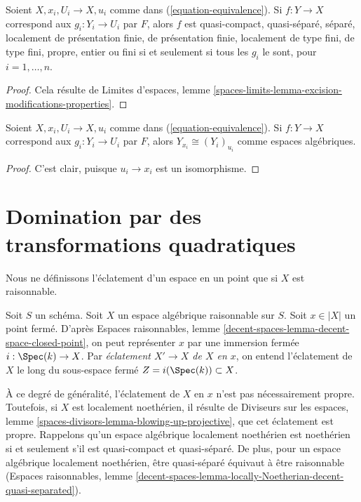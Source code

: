 \begin{lemma}
\label{lemma-equivalence-properties}
Soient $X, x_i, U_i \to X, u_i$ comme dans
(\ref{equation-equivalence}). Si $f : Y \to X$ correspond aux
$g_i : Y_i \to U_i$ par $F$, alors $f$ est quasi-compact, quasi-séparé,
séparé, localement de présentation finie, de présentation finie, localement
de type fini, de type fini, propre, entier ou fini si et seulement si tous les
$g_i$ le sont, pour $i = 1, \ldots, n$.
\end{lemma}

\begin{proof}
Cela résulte de Limites d'espaces, lemme
\ref{spaces-limits-lemma-excision-modifications-properties}.
\end{proof}

\begin{lemma}
\label{lemma-equivalence-fibre}
Soient $X, x_i, U_i \to X, u_i$ comme dans
(\ref{equation-equivalence}). Si $f : Y \to X$ correspond aux
$g_i : Y_i \to U_i$ par $F$, alors
$Y_{x_i} \cong (Y_i)_{u_i}$ comme espaces algébriques.
\end{lemma}

\begin{proof}
C'est clair, puisque $u_i \to x_i$ est un isomorphisme.
\end{proof}







\section{Domination par des transformations quadratiques}
\label{section-quadratic-spaces}

\noindent
Nous ne définissons l'éclatement d'un espace en un point que si $X$ est
raisonnable.

\begin{definition}
\label{definition-blowup-at-point}
Soit $S$ un schéma. Soit $X$ un espace algébrique raisonnable sur $S$.
Soit $x \in |X|$ un point fermé. D'après Espaces raisonnables, lemme
\ref{decent-spaces-lemma-decent-space-closed-point}, on peut représenter $x$
par une immersion fermée $i : \Spec(k) \to X$.
Par {\it éclatement $X' \to X$ de $X$ en $x$}, on entend l'éclatement de $X$
le long du sous-espace fermé $Z = i(\Spec(k)) \subset X$.
\end{definition}

\noindent
À ce degré de généralité, l'éclatement de $X$ en $x$ n'est pas nécessairement
propre. Toutefois, si $X$ est localement noethérien, il résulte de
Diviseurs sur les espaces, lemme
\ref{spaces-divisors-lemma-blowing-up-projective}, que cet éclatement est
propre. Rappelons qu'un espace algébrique localement noethérien est noethérien
si et seulement s'il est quasi-compact et quasi-séparé. De plus, pour un
espace algébrique localement noethérien, être quasi-séparé équivaut à être
raisonnable (Espaces raisonnables, lemme
\ref{decent-spaces-lemma-locally-Noetherian-decent-quasi-separated}).

